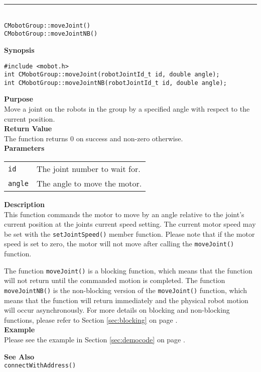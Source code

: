 \noindent
\vspace{5pt}
\rule{4.5in}{0.015in}\\
\noindent
{\LARGE \texttt{CMobotGroup::moveJoint()}}\\
{\LARGE \texttt{CMobotGroup::moveJointNB()}}\\
{}

\noindent
{\bf Synopsis}
\vspace{-8pt}
\begin{verbatim}
#include <mobot.h>
int CMobotGroup::moveJoint(robotJointId_t id, double angle);
int CMobotGroup::moveJointNB(robotJointId_t id, double angle);
\end{verbatim}

\noindent
{\bf Purpose}\\
Move a joint on the robots in the group by a specified angle with respect
to the current position.\\

\noindent
{\bf Return Value}\\
The function returns 0 on success and non-zero otherwise.\\

\noindent
{\bf Parameters}\\
\vspace{-0.1in}
\begin{description}
\item               
\begin{tabular}{p{10 mm}p{145 mm}}
\texttt{id} & The joint number to wait for. \\
\texttt{angle} & The angle to move the motor.  \\
\end{tabular}
\end{description}

\noindent
{\bf Description}\\
This function commands the motor to move by an angle relative to the
joint's current position at the joints current speed setting.
The current motor speed may be set with the
\texttt{setJointSpeed()} member function. Please note that if the motor speed
is set to zero, the motor will not move after calling the
\texttt{moveJoint()} function. 

The function \texttt{moveJoint()} is a blocking function, which means that 
the function will not return until the commanded motion is 
completed. The function \texttt{moveJointNB()} is the non-blocking version of
the \texttt{moveJoint()} function, which means that the function will return
immediately and the physical robot motion will occur asynchronously. For
more details on blocking and non-blocking functions, please refer to 
Section \ref{sec:blocking} on page \pageref{sec:blocking}.\\

\noindent
{\bf Example}\\
Please see the example in Section \ref{sec:democode} on page \pageref{sec:democode}.\\
\noindent

\noindent
{\bf See Also}\\
\texttt{connectWithAddress()}


